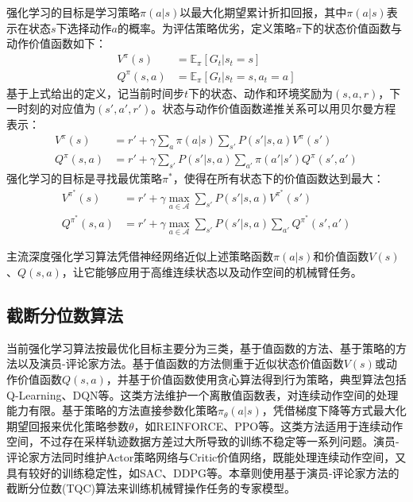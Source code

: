 强化学习的目标是学习策略$\pi(a|s)$以最大化期望累计折扣回报，其中$\pi(a|s)$表示在状态$s$下选择动作$a$的概率。为评估策略优劣，定义策略$\pi$下的状态价值函数与动作价值函数如下：
\begin{align}
    V^\pi(s) &= \mathbb{E}_\pi[G_t | s_t = s] \\
    Q^\pi(s, a) &= \mathbb{E}_\pi[G_t | s_t = s, a_t = a]
\end{align}
基于上式给出的定义，记当前时间步$t$下的状态、动作和环境奖励为$(s, a, r)$，下一时刻的对应值为$(s', a', r')$。状态与动作价值函数递推关系可以用贝尔曼方程表示：
\begin{align}
    V^\pi(s) &= r' + \gamma \sum_{a} \pi(a|s) \sum_{s'} P(s'|s,a) V^\pi(s') \\
    Q^\pi(s, a) &=r' + \gamma \sum_{s'} P(s'|s,a) \sum_{a'} \pi(a'|s') Q^\pi(s', a')
\end{align}
强化学习的目标是寻找最优策略$\pi^*$，使得在所有状态下的价值函数达到最大：
\begin{align}
    V^{\pi^*}(s) &= r' + \gamma \max_{a \in \mathcal{A}}{\sum_{s'} P(s'|s,a) V^{\pi^*}(s')} \\
    Q^{\pi^*}(s, a) &=r' + \gamma \max_{a \in \mathcal{A}}{\sum_{s'} P(s'|s,a) \sum_{a'} Q^{\pi^*}(s', a')}
\end{align}

主流深度强化学习算法凭借神经网络近似上述策略函数$\pi(a|s)$和价值函数$V(s)$、$Q(s,a)$，让它能够应用于高维连续状态以及动作空间的机械臂任务。

\subsection{截断分位数算法}\label{sec:tqc}
当前强化学习算法按最优化目标主要分为三类，基于值函数的方法、基于策略的方法以及演员-评论家方法。基于值函数的方法侧重于近似状态价值函数$V(s)$或动作价值函数$Q(s,a)$，并基于价值函数使用贪心算法得到行为策略，典型算法包括Q-Learning\cite{watkins1992q}、DQN\cite{mnih2013playing}等。这类方法维护一个离散值函数表，对连续动作空间的处理能力有限。基于策略的方法直接参数化策略$\pi_\theta(a|s)$，凭借梯度下降等方式最大化期望回报来优化策略参数$\theta$，如REINFORCE\cite{williams1992simple}、PPO\cite{schulman2017proximal}等。这类方法适用于连续动作空间，不过存在采样轨迹数据方差过大所导致的训练不稳定等一系列问题。演员-评论家方法同时维护Actor策略网络与Critic价值网络，既能处理连续动作空间，又具有较好的训练稳定性，如SAC\cite{haarnoja2018soft}、DDPG\cite{lillicrap2020continuous}等。本章则使用基于演员-评论家方法的截断分位数(TQC)算法\cite{kuznetsov2020tqc}来训练机械臂操作任务的专家模型。

